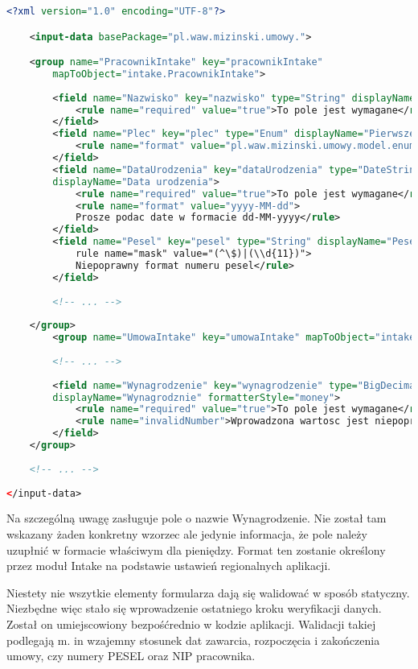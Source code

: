 \begin{lstlisting}[language=XML,style=outcode,showstringspaces=false,caption=Konfiguracja modułu Intake,label={intakeGroupFactory}]
<?xml version="1.0" encoding="UTF-8"?>

	<input-data basePackage="pl.waw.mizinski.umowy.">

	<group name="PracownikIntake" key="pracownikIntake" 
		mapToObject="intake.PracownikIntake">
		
		<field name="Nazwisko" key="nazwisko" type="String" displayName="Nazwisko">
			<rule name="required" value="true">To pole jest wymagane</rule>
		</field>
		<field name="Plec" key="plec" type="Enum" displayName="Pierwsze imie">
			<rule name="format" value="pl.waw.mizinski.umowy.model.enums.Plec"/>
		</field>
		<field name="DataUrodzenia" key="dataUrodzenia" type="DateString" 
		displayName="Data urodzenia">
			<rule name="required" value="true">To pole jest wymagane</rule>
			<rule name="format" value="yyyy-MM-dd">
			Prosze podac date w formacie dd-MM-yyyy</rule>
		</field>
		<field name="Pesel" key="pesel" type="String" displayName="Pesel">
			rule name="mask" value="(^\$)|(\\d{11})">
			Niepoprawny format numeru pesel</rule>
		</field>
		
		<!-- ... -->
		
	</group>
		<group name="UmowaIntake" key="umowaIntake" mapToObject="intake.UmowaIntake">
		
		<!-- ... -->
		
		<field name="Wynagrodzenie" key="wynagrodzenie" type="BigDecimal" 
		displayName="Wynagrodznie" formatterStyle="money">
			<rule name="required" value="true">To pole jest wymagane</rule>
			<rule name="invalidNumber">Wprowadzona wartosc jest niepoprawna</rule>
		</field>
	</group>
	
	<!-- ... -->
	
</input-data>
\end{lstlisting}

Na szczególną uwagę zasługuje pole o nazwie Wynagrodzenie. Nie został tam wskazany żaden konkretny wzorzec ale jedynie informacja, że pole należy uzupłnić w formacie właściwym dla pieniędzy. Format ten zostanie określony przez moduł Intake na podstawie ustawień regionalnych aplikacji. 

Niestety nie wszytkie elementy formularza dają się walidować w sposób statyczny. Niezbędne więc stało się wprowadzenie ostatniego kroku weryfikacji danych. Został on umiejscowiony bezpośćrednio w kodzie aplikacji. Walidacji takiej podlegają m. in wzajemny stosunek dat zawarcia, rozpoczęcia i zakończenia umowy, czy numery PESEL oraz NIP pracownika.

